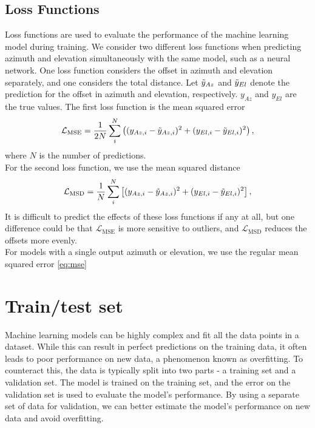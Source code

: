 \subsection{Loss Functions}
Loss functions are used to evaluate the performance of the machine learning model during training.
We consider two different loss functions when predicting azimuth and elevation simultaneously with the same model, such as a neural network.
One loss function considers the offset in azimuth and elevation separately, and one considers the total distance.
Let $\Tilde{y}_{Az}$ and $\Tilde{y}_{El}$ denote the prediction for the offset in azimuth and elevation, respectively.
$y_{Az}$ and $y_{El}$ are the true values.
The first loss function is the mean squared error 
\begin{equation}\label{eq:mse1}
    \mathcal{L}_{\text{MSE}} = \frac{1}{2N}\sum_i^N \left( (y_{Az,i}-\Tilde{y}_{Az,i})^2 + (y_{El,i}-\Tilde{y}_{El,i})^2 \right),
\end{equation}
where $N$ is the number of predictions. 
\\
For the second loss function, we use the mean squared distance
\begin{equation}\label{eq:totaloff}
    \mathcal{L}_{\text{MSD}} = \frac{1}{N}\sum_i^N \left[ (y_{Az,i}-\Tilde{y}_{Az,i})^2 + (y_{El,i}-\Tilde{y}_{El,i})^2 \right],
\end{equation}
It is difficult to predict the effects of these loss functions if any at all, but one difference could be that $\mathcal{L}_{\text{MSE}}$ is more sensitive to outliers,
and $\mathcal{L}_{\text{MSD}}$ reduces the offsets more evenly. \\

For models with a single output azimuth or elevation, we use the regular mean squared error \eqref{eq:mse}

\section{Train/test set}
Machine learning models can be highly complex and fit all the data points in a dataset.
While this can result in perfect predictions on the training data, it often leads to poor performance on new data, a phenomenon known as overfitting.
To counteract this, the data is typically split into two parts - a training set and a validation set.
The model is trained on the training set, and the error on the validation set is used to evaluate the model's performance. 
By using a separate set of data for validation, we can better estimate the model's performance on new data and avoid overfitting.

